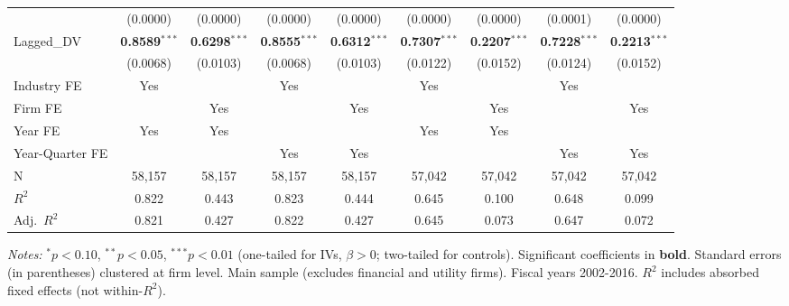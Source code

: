 \documentclass[11pt,a4paper]{article}
\begin{document}
\begin{table}[htbp]
\begin{tabular}{lcccccccc}
 & (0.0000) & (0.0000) & (0.0000) & (0.0000) & (0.0000) & (0.0000) & (0.0001) & (0.0000) \\
Lagged\_DV & \textbf{0.8589}$^{***}$ & \textbf{0.6298}$^{***}$ & \textbf{0.8555}$^{***}$ & \textbf{0.6312}$^{***}$ & \textbf{0.7307}$^{***}$ & \textbf{0.2207}$^{***}$ & \textbf{0.7228}$^{***}$ & \textbf{0.2213}$^{***}$ \\
 & (0.0068) & (0.0103) & (0.0068) & (0.0103) & (0.0122) & (0.0152) & (0.0124) & (0.0152) \\
\midrule
Industry FE & Yes &  & Yes &  & Yes &  & Yes &  \\
Firm FE &  & Yes &  & Yes &  & Yes &  & Yes \\
Year FE & Yes & Yes &  &  & Yes & Yes &  &  \\
Year-Quarter FE &  &  & Yes & Yes &  &  & Yes & Yes \\
\midrule
N & 58,157 & 58,157 & 58,157 & 58,157 & 57,042 & 57,042 & 57,042 & 57,042 \\
$R^2$ & 0.822 & 0.443 & 0.823 & 0.444 & 0.645 & 0.100 & 0.648 & 0.099 \\
Adj.~$R^2$ & 0.821 & 0.427 & 0.822 & 0.427 & 0.645 & 0.073 & 0.647 & 0.072 \\
\bottomrule
\end{tabular}
\begin{minipage}{\linewidth}
\vspace{2pt}\scriptsize
\textit{Notes:} $^{*}p<0.10$, $^{**}p<0.05$, $^{***}p<0.01$ (one-tailed for IVs, $\beta > 0$; two-tailed for controls).
 Significant coefficients in \textbf{bold}.
 Standard errors (in parentheses) clustered at firm level.
 Main sample (excludes financial and utility firms). Fiscal years 2002-2016.
 $R^2$ includes absorbed fixed effects (not within-$R^2$).
\end{minipage}
\end{table}
\clearpage
\end{document}
